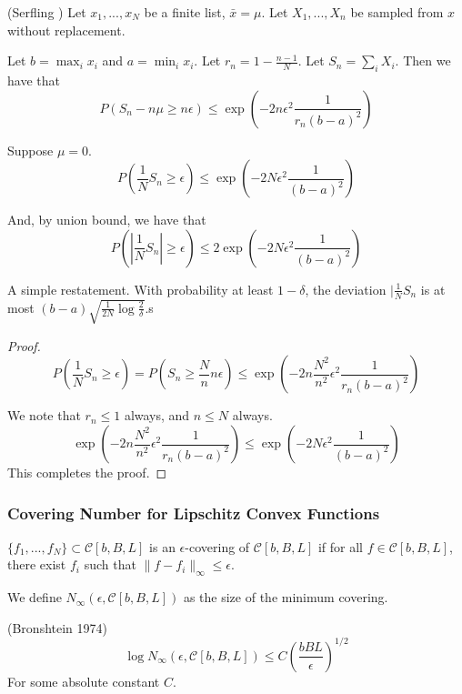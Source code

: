 \begin{lemma} (Serfling \cite{serfling1974probability}) 
Let $x_1,..., x_N$ be a finite list, $\bar{x} = \mu$. Let $X_1,...,X_n$ be sampled from $x$ without replacement. 

Let $b = \max_i x_i$ and $a = \min_i x_i$. Let $r_n = 1- \frac{n-1}{N}$. Let $S_n = \sum_i X_i$.
Then we have that
\[
P( S_n - n \mu \geq n \epsilon) \leq \exp( - 2 n \epsilon^2 \frac{1}{r_n (b-a)^2})
\]
\end{lemma}

\begin{corollary}
\label{cor:serfling}
Suppose $\mu = 0$. 
\[
P( \frac{1}{N} S_n \geq \epsilon) \leq \exp( -2 N \epsilon^2 \frac{1}{(b-a)^2})
\]

And, by union bound, we have that
\[
P( | \frac{1}{N} S_n| \geq \epsilon) \leq 2 \exp( -2 N \epsilon^2 \frac{1}{(b-a)^2})
\]

\end{corollary}

A simple restatement. With probability at least $1- \delta$, the deviation $| \frac{1}{N} S_n$ is at most $ (b-a) \sqrt{ \frac{1}{2N} \log \frac{2}{\delta}}$.s

\begin{proof}
\[
P( \frac{1}{N} S_n \geq \epsilon) = P( S_n \geq \frac{N}{n} n \epsilon) \leq \exp( - 2 n \frac{N^2}{n^2} \epsilon^2 \frac{1}{r_n (b-a)^2} ) 
\]

We note that $r_n \leq 1$ always, and $n \leq N$ always. 
\[
\exp( - 2 n \frac{N^2}{n^2} \epsilon^2 \frac{1}{r_n (b-a)^2} )  \leq \exp( - 2 N \epsilon^2 \frac{1}{(b-a)^2})
\]
This completes the proof.

\end{proof}

\subsubsection{Covering Number for Lipschitz Convex Functions}

\begin{definition}
$\{ f_1,..., f_N\} \subset \mathcal{C}[b,B,L]$ is an $\epsilon$-covering of $\mathcal{C}[b,B,L]$ if for all $f \in \mathcal{C}[b,B,L]$, there exist $f_i$ such that $\| f - f_i \|_\infty \leq \epsilon$.

We define $N_\infty( \epsilon, \mathcal{C}[b,B,L])$ as the size of the minimum covering.
\end{definition}

\begin{lemma} (Bronshtein 1974)
\[
\log N_\infty (\epsilon, \mathcal{C}[b,B,L]) \leq C\left( \frac{bBL}{\epsilon} \right)^{1/2}
\]
For some absolute constant $C$.
\end{lemma}

